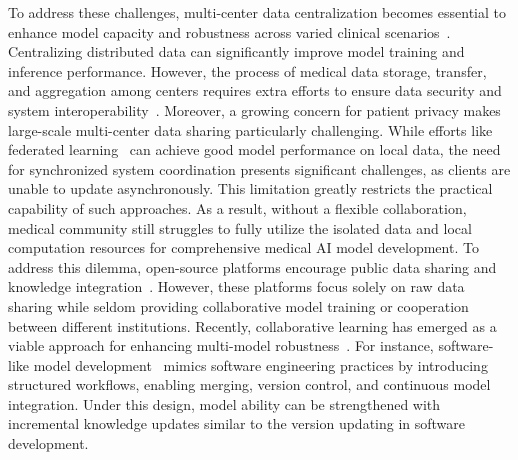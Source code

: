 To address these challenges, multi-center data centralization becomes essential to enhance model capacity and robustness across varied clinical scenarios~\cite{rajpurkar2022ai}. 
Centralizing distributed data can significantly improve model training and inference performance.
However, the process of medical data storage, transfer, and aggregation among centers requires extra efforts to ensure data security and system interoperability~\cite{bradford2020international}.
Moreover, a growing concern for patient privacy makes large-scale multi-center data sharing particularly challenging. 
While efforts like federated learning~\cite{wen2023survey, li2020review} can achieve good model performance on local data, the need for synchronized system coordination presents significant challenges, as clients are unable to update asynchronously. This limitation greatly restricts the practical capability of such approaches.
As a result, without a flexible collaboration, medical community still struggles to fully utilize the isolated data and local computation resources for comprehensive medical AI model development. 
To address this dilemma, open-source platforms encourage public data sharing and knowledge integration~\cite{markiewicz2021openneuro, zenodo}.
However, these platforms focus solely on raw data sharing while seldom providing collaborative model training or cooperation between different institutions.
Recently, collaborative learning has emerged as a viable approach for enhancing multi-model robustness~\cite{boulemtafes2020review}. 
For instance, software-like model development~\cite{raffel2023building} mimics software engineering practices by introducing structured workflows, enabling merging, version control, and continuous model integration.
Under this design, model ability can be strengthened with incremental knowledge updates similar to the version updating in software development. 

